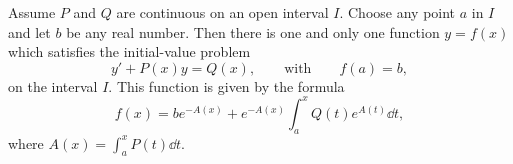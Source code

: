     \begin{theoremenv}
        Assume \(P\) and \(Q\) are continuous on an open interval \(I\). Choose any point \(a\) in \(I\) and let \(b\) be any real number. Then there is one and only one function \(y=f(x)\) which satisfies the initial-value problem
        \[
        y'+P(x)y=Q(x),\qquad \text{with}\qquad f(a)=b,
        \]
        on the interval \(I\). This function is given by the formula
        \[
        f(x)=be^{-A(x)}+e^{-A(x)}\int_a^x Q(t)e^{A(t)}\dd t,
        \]
        where \(\displaystyle A(x)=\int_a^x P(t)\dd t\).
    \end{theoremenv}
    \newpage